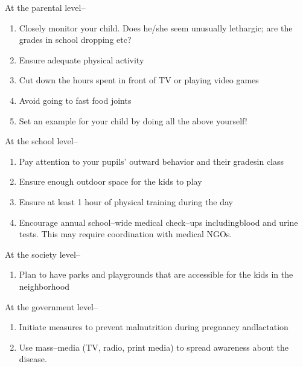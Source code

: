 \noindent
At the parental level–

\begin{enumerate}[•]
\itemsep=0pt
\item Closely monitor your child. Does he/she seem unusually lethargic; are the grades in school dropping etc?
\item Ensure adequate physical activity
\item Cut down the hours spent in front of TV or playing video games
\item Avoid going to fast food joints
\item Set an example for your child by doing all the above yourself!
\end{enumerate}

\noindent
At the school level–

\begin{enumerate}[•]
\itemsep=0pt
\item Pay attention to your pupils’ outward behavior and their grades\break in class
\item Ensure enough outdoor space for the kids to play
\item Ensure at least 1 hour of physical training during the day
\item Encourage annual school–wide medical check–ups including\break blood and urine tests. This may require coordination with medical NGOs.
\end{enumerate}

\noindent
At the society level–

\begin{enumerate}[•]
\itemsep=0pt
\item Plan to have parks and playgrounds that are accessible for the kids in the neighborhood
 \end{enumerate}

\clearpage

\noindent At the government level–

\begin{enumerate}[•]
\itemsep=0pt
\item Initiate measures to prevent malnutrition during pregnancy and\break lactation
 \item Use mass–media (TV, radio, print media) to spread awareness about the disease.
 \end{enumerate}

